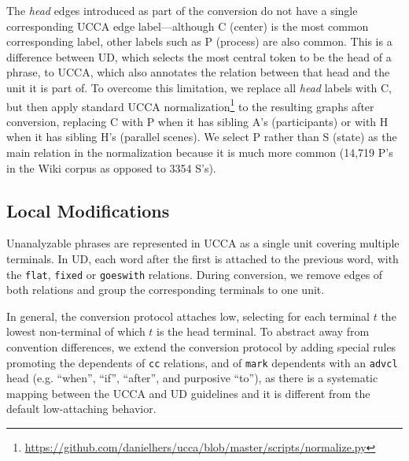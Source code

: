 \documentclass[11pt,a4paper]{article}
\begin{document}
The \textit{head} edges introduced as part of the conversion do not have a single
corresponding UCCA edge label---although C (center) is the most common corresponding label,
other labels such as P (process) are also common.
This is a difference between UD, which selects the most central token to be the head of a phrase,
to UCCA, which also annotates the relation between that head and the unit it is part of.
To overcome this limitation, we replace all \textit{head} labels with C, but then
apply standard UCCA
normalization\footnote{\url{https://github.com/danielhers/ucca/blob/master/scripts/normalize.py}}
to the resulting graphs after conversion,
replacing C with P when it has sibling A's (participants) or
with H when it has sibling H's (parallel scenes).
We select P rather than S (state) as the main relation in the normalization because
it is much more common (14,719 P's in the Wiki corpus as opposed to 3354 S's).

\subsection{Local Modifications}\label{sec:local}

Unanalyzable phrases are represented in UCCA as a single unit covering multiple terminals.
In UD, each word after the first is attached to the previous word,
with the \verb|flat|, \verb|fixed| or \verb|goeswith| relations.
During conversion, we remove edges of both relations and group the corresponding terminals to one unit.

In general, the conversion protocol attaches low,
selecting for each terminal $t$ the lowest non-terminal of which $t$
is the head terminal.
To abstract away from convention differences,
we extend the conversion protocol by adding special rules
promoting the dependents of \verb|cc| relations,
and of \verb|mark| dependents with an \verb|advcl| head
(e.g. ``when'', ``if'', ``after'', and purposive ``to''),
as there is a systematic mapping between the UCCA and UD guidelines
and it is different from the default low-attaching behavior.
\end{document}
